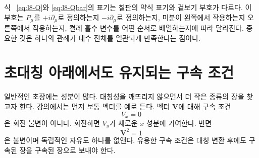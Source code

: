 \begin{classroomqa}\end{classroomqa}

\begin{classroomqa}\end{classroomqa}

\begin{classroomqa}\end{classroomqa}

식 ~\eqref{eq:l8-Q}와 \eqref{eq:l8-Qbar}의 표기는 칠판의 약식 표기와 겉보기 부호가 다르다. 이 부호는 \(P_\mu\)를 \(+i\partial_\mu\)로 정의하는지 \(-i\partial_\mu\)로 정의하는지, 미분이 왼쪽에서 작용하는지 오른쪽에서 작용하는지, 켤레 홀수 변수를 어떤 순서로 배열하는지에 따라 달라진다. 중요한 것은 하나의 관례가 대수 전체를 일관되게 만족한다는 점이다.

\section{초대칭 아래에서도 유지되는 구속 조건}

일반적인 초장에는 성분이 많다. 대칭성을 깨뜨리지 않으면서 더 작은 종류의 장을 찾고자 한다. 강의에서는 먼저 보통 벡터를 예로 든다. 벡터 \(\mathbf V\)에 대해 구속 조건
\begin{equation}
V_x=0
\end{equation}
은 회전 불변이 아니다. 회전하면 \(V_y\)가 새로운 \(x\) 성분에 기여한다. 반면
\begin{equation}
\mathbf V^2=1
\end{equation}
은 불변이며 독립적인 자유도 하나를 없앤다. 유용한 구속 조건은 대칭 변환 후에도 구속된 장을 구속된 장으로 보내야 한다.

